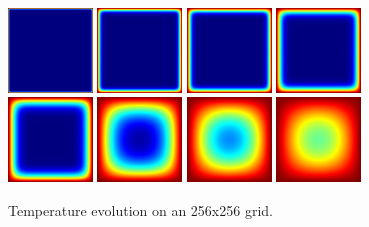\documentclass[11pt]{article}
\begin{document}
    \begin{figure}[ht]
        \centering
        \includegraphics[width=0.20\textwidth]{img/T_0015.png}
        \includegraphics[width=0.20\textwidth]{img/T_0150.png}
        \includegraphics[width=0.20\textwidth]{img/T_0250.png}
        \includegraphics[width=0.20\textwidth]{img/T_0500.png}
        \\[\smallskipamount]
        \includegraphics[width=0.20\textwidth]{img/T_1000.png}
        \includegraphics[width=0.20\textwidth]{img/T_5000.png}
        \includegraphics[width=0.20\textwidth]{img/T_10000.png}
        \includegraphics[width=0.20\textwidth]{img/T_15000.png}
        \caption{Temperature evolution on an 256x256 grid.}
        \label{fig:final_grid}
    \end{figure}
\end{document}
